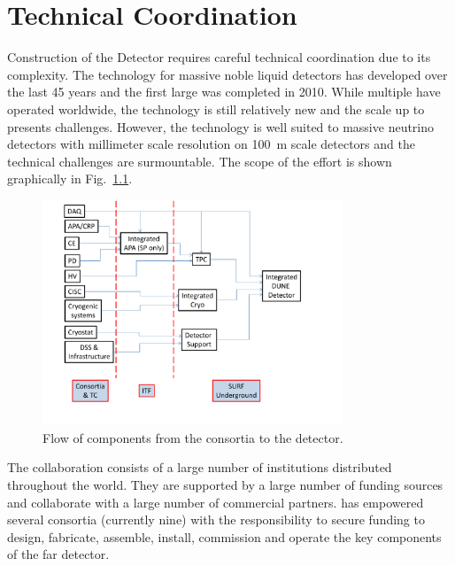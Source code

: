 \chapter{Technical Coordination}
\label{ch:fdsp-coord}

Construction of the  Detector requires careful technical
coordination due to its complexity. The technology for massive noble
liquid detectors has developed over the last \num{45} years and the first
large  was completed in
2010. While multiple  have operated worldwide, the technology
is still relatively new and the scale up to  presents
challenges. However, the technology is well suited to massive neutrino
detectors with millimeter scale resolution on \SI{100}{m} scale detectors and
the technical challenges are surmountable. The scope of the effort is shown graphically in Fig.~\ref{fig:TC_flow}.
\begin{figure}[htb]
  \begin{center}
    \includegraphics[width=0.8\textwidth]{far-detector-generic/figures/DUNE_deliverable_flow}
    \caption{Flow of components from the consortia to the detector.}
    \label{fig:TC_flow}
  \end{center}
\end{figure}



The  collaboration consists of a large number of
institutions distributed throughout the world. They are supported by a
large number of funding sources and collaborate with a large number of
commercial partners.  has empowered several consortia
(currently nine) with the responsibility to secure funding to design,
fabricate, assemble, install, commission and operate the key
components of the  far detector.

